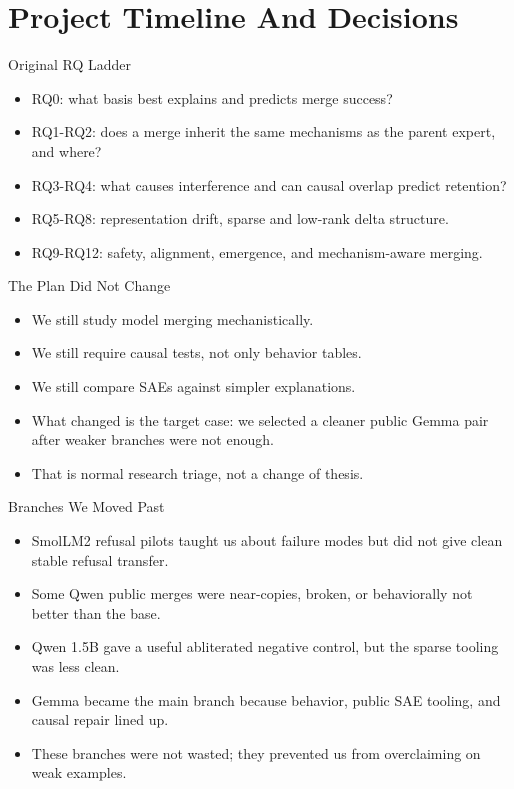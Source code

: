 \documentclass[aspectratio=169]{beamer}
\begin{document}
\section{Project Timeline And Decisions}

\begin{frame}{Original RQ Ladder}
\small
\begin{itemize}
  \item RQ0: what basis best explains and predicts merge success?
  \item RQ1-RQ2: does a merge inherit the same mechanisms as the parent expert, and where?
  \item RQ3-RQ4: what causes interference and can causal overlap predict retention?
  \item RQ5-RQ8: representation drift, sparse and low-rank delta structure.
  \item RQ9-RQ12: safety, alignment, emergence, and mechanism-aware merging.
\end{itemize}
\end{frame}

\begin{frame}{The Plan Did Not Change}
\small
\begin{itemize}
  \item We still study model merging mechanistically.
  \item We still require causal tests, not only behavior tables.
  \item We still compare SAEs against simpler explanations.
  \item What changed is the target case: we selected a cleaner public Gemma pair after weaker branches were not enough.
  \item That is normal research triage, not a change of thesis.
\end{itemize}
\end{frame}

\begin{frame}{Branches We Moved Past}
\small
\begin{itemize}
  \item SmolLM2 refusal pilots taught us about failure modes but did not give clean stable refusal transfer.
  \item Some Qwen public merges were near-copies, broken, or behaviorally not better than the base.
  \item Qwen 1.5B gave a useful abliterated negative control, but the sparse tooling was less clean.
  \item Gemma became the main branch because behavior, public SAE tooling, and causal repair lined up.
  \item These branches were not wasted; they prevented us from overclaiming on weak examples.
\end{itemize}
\end{frame}
\end{document}
